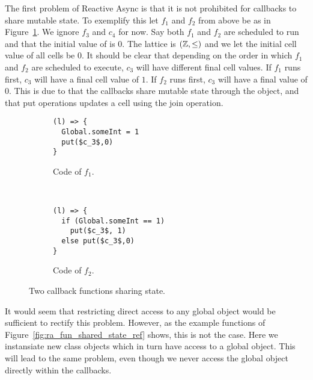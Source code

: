 The first problem of Reactive Async is that it is not prohibited for callbacks
to share mutable state. To exemplify this let $f_1$ and $f_2$ from above be as
in Figure~\ref{fig:ra_fun_shared_state}. We ignore $f_3$ and $c_4$ for now. 
Say both $f_1$ and $f_2$ are scheduled to run and that the initial value of
 is $0$.  The lattice is $(\mathbb{Z}, \leq)$ and we let the
initial cell value of all cells be $0$.  It should be clear that depending on
the order in which $f_1$ and $f_2$ are scheduled to execute, $c_3$ will have 
different final cell values. If $f_1$ runs first, $c_3$ will have a final cell
value of $1$. If $f_2$ runs first, $c_3$ will have a final value of $0$. This is
due to that the callbacks share mutable state through the  object,
and that put operations updates a cell using the join operation.

\begin{figure}
  \begin{subfigure}[b]{0.4\textwidth}
    \begin{lstlisting}
(l) => {
  Global.someInt = 1
  put($c_3$,0)
}
    \end{lstlisting}
    \caption{Code of $f_1$.}
  \end{subfigure}
  ~
  \begin{subfigure}[b]{0.4\textwidth}
    \begin{lstlisting}
(l) => {
  if (Global.someInt == 1)
    put($c_3$, 1)
  else put($c_3$,0)
}
    \end{lstlisting}
    \caption{Code of $f_2$.}
  \end{subfigure}
  \caption{Two callback functions sharing state.}
  \label{fig:ra_fun_shared_state}
\end{figure}

It would seem that restricting direct access to any global object would be
sufficient to rectify this problem. However, as the example functions of
Figure~\ref{fig:ra_fun_shared_state_ref} shows, this is not the case. Here we
instansiate new class objects which in turn have access to a global object. This
will lead to the same problem, even though we never access the global object
directly within the callbacks.

